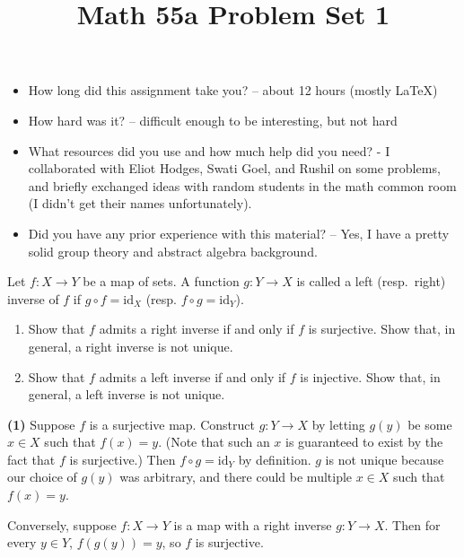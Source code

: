 \documentclass[11pt,letterpaper]{article}
\title{\textbf{Math 55a Problem Set 1}}
\begin{document}
\maketitle
\setcounter{page}{0}
\thispagestyle{empty}

\begin{itemize}
  \item How long did this assignment take you? -- about 12 hours (mostly \LaTeX)
  \item How hard was it? -- difficult enough to be interesting, but not hard
  \item What resources did you use and how much help did you need? - I collaborated with Eliot Hodges, Swati Goel, and Rushil on some problems, and briefly exchanged ideas with random students in the math common room (I didn't get their names unfortunately).
  \item Did you have any prior experience with this material? -- Yes, I have a pretty solid group theory and abstract algebra background.
\end{itemize}

\pagebreak

\begin{problem}
  Let $f:X\to Y$ be a map of sets. A function $g:Y\to X$ is called a
  left (resp.\ right) inverse of $f$ if $g\circ f=\mathrm{id}_X$ (resp.
  $f\circ g=\mathrm{id}_Y$).

  \begin{enumerate}
      \item Show that $f$ admits a right inverse if and only if $f$ is surjective. Show that, in general, a right inverse is not unique.
      
      \item Show that $f$ admits a left inverse if and only if $f$ is injective. Show that, in general, a left inverse is not unique.
  \end{enumerate}
\end{problem}

\textbf{(1)} Suppose $f$ is a surjective map. Construct $g : Y \to X$ by letting $g(y)$ be some $x \in X$ such that $f(x)=y$. (Note that such an $x$ is guaranteed to exist by the fact that $f$ is surjective.) Then $f \circ g = \mathrm{id}_Y$ by definition. $g$ is not unique because our choice of $g(y)$ was arbitrary, and there could be multiple $x\in X$ such that $f(x)=y$. 

Conversely, suppose $f : X \to Y$ is a map with a right inverse $g : Y \to X$. Then for every $y \in Y$, $f(g(y)) = y$, so $f$ is surjective. 
\end{document}
